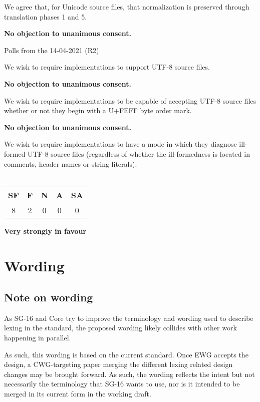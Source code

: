 \documentclass{wg21}
\begin{document}
\begin{quoteblock}
We agree that, for Unicode source files, that normalization is preserved through translation phases 1 and 5.

\textbf{No objection to unanimous consent.}    
\end{quoteblock}

Polls from the 14-04-2021 (R2)

\begin{quoteblock}
We wish to require implementations to support UTF-8 source files.

\textbf{No objection to unanimous consent.}
\end{quoteblock}


\begin{quoteblock}
We wish to require implementations to be capable of accepting UTF-8
source files whether or not they begin with a U+FEFF byte order mark.

\textbf{No objection to unanimous consent.}
\end{quoteblock}

\begin{quoteblock}
We wish to require implementations to have a mode in which they diagnose
ill-formed UTF-8 source files (regardless of whether the ill-formedness is
located in comments, header names or string literals).
\\\\
\begin{tabular}{|c|c|c|c|c|}
    \hline
    SF & F & N & A & SA \\
    \hline
    8 & 2 & 0 & 0 & 0 \\
    \hline
\end{tabular}

\textbf{Very strongly in favour} 
\end{quoteblock}

\section{Wording}

\subsection{Note on wording}

As SG-16 and Core try to improve the terminology and wording used to describe lexing in the standard,
the proposed wording likely collides with other work happening in parallel.

As such, this wording is based on the current standard.
Once EWG accepts the design, a CWG-targeting paper merging the different lexing related design changes may be brought forward.
As such, the wording reflects the intent but not necessarily the terminology that SG-16 wants to use, nor is it intended to be merged in its current form in the working draft.
\end{document}

